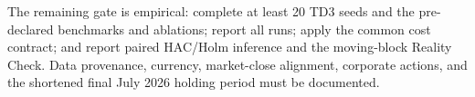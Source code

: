 The remaining gate is empirical: complete at least 20 TD3 seeds and the
pre-declared benchmarks and ablations; report all runs; apply the common cost
contract; and report paired HAC/Holm inference and the moving-block Reality
Check. Data provenance, currency, market-close alignment, corporate actions,
and the shortened final July 2026 holding period must be documented.

